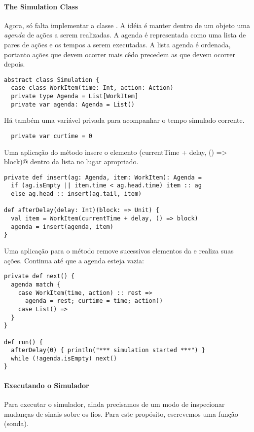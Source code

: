 \paragraph{The Simulation Class}
Agora, só falta implementar a classe . A idéia é
manter dentro de um objeto  uma \emph{agenda} de
ações a serem realizadas. A agenda é representada como uma lista de
pares de ações e os tempos a serem executadas. A lista agenda é
ordenada, portanto ações que devem ocorrer mais cêdo precedem as que
devem ocorrer depois.
\begin{lstlisting} 
abstract class Simulation {
  case class WorkItem(time: Int, action: Action)
  private type Agenda = List[WorkItem]
  private var agenda: Agenda = List()
\end{lstlisting}
Há também uma variável privada  para acompanhar o tempo
simulado corrente.
\begin{lstlisting}
  private var curtime = 0
\end{lstlisting}
Uma aplicação do método  insere o
elemento \lstinline@WorkItem(currentTime + delay, () => block)@ 
dentro da lista  no lugar apropriado.
\begin{lstlisting}
private def insert(ag: Agenda, item: WorkItem): Agenda =
  if (ag.isEmpty || item.time < ag.head.time) item :: ag
  else ag.head :: insert(ag.tail, item)

def afterDelay(delay: Int)(block: => Unit) {
  val item = WorkItem(currentTime + delay, () => block)
  agenda = insert(agenda, item)
}
\end{lstlisting}
Uma aplicação para o método  remove sucessivos elementos
da  e realiza suas ações. Continua até que a agenda
esteja vazia:
\begin{lstlisting}
private def next() {
  agenda match {
    case WorkItem(time, action) :: rest =>
      agenda = rest; curtime = time; action()
    case List() =>
  }
}

def run() {
  afterDelay(0) { println("*** simulation started ***") }
  while (!agenda.isEmpty) next()
}
\end{lstlisting}

\paragraph{Executando o Simulador}
Para executar o simulador, ainda precisamos de um modo de inspecionar
mudanças de sinais sobre os fios.  Para este propósito, escrevemos uma
função  (sonda).

